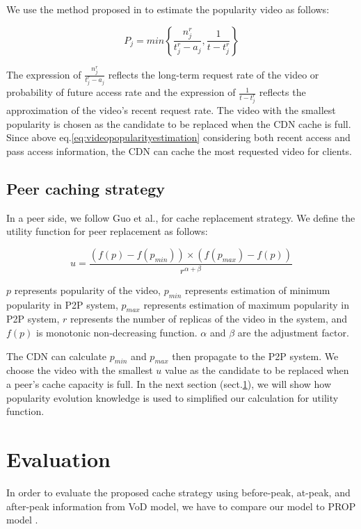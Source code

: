 \documentclass[conference]{IEEEtran}
\begin{document}
We use the method proposed in \cite{1613869} to estimate the popularity video as follows:

\begin{equation}
P_j = min\left\{\frac{n_j^r}{t_j^r - a_j}, \frac{1}{t - t_j^r}\right\}
\label{eq:videopopularityestimation}
\end{equation}

The expression of $\frac{n_j^r}{t_j^r - a_j}$ reflects the long-term request rate of the video or probability of future access rate and the expression of $\frac{1}{t - t_j^r}$ reflects the approximation of the video's recent request rate.
The video with the smallest popularity is chosen as the candidate to be replaced when the CDN cache is full. 
Since above eq.\ref{eq:videopopularityestimation} considering both recent access and pass access information, the CDN can cache the most requested video for clients.

\subsection{Peer caching strategy}\label{peercachingstrategy}
In a peer side, we follow Guo et al., \cite{1613869} for cache replacement strategy. 
We define the utility function for peer replacement as follows:

\begin{equation}
u = \frac{ (f(p)-f(p_{min})) \times  (f(p_{max})-f(p))}{r^{\alpha + \beta}}
\label{eq:utilityfunction}
\end{equation}

$p$ represents popularity of the video, $p_{min}$ represents estimation of minimum popularity in P2P system, $p_{max}$ represents estimation of maximum popularity in P2P system, $r$ represents the number of replicas of the video in the system, and $f(p)$ is monotonic non-decreasing function.
$\alpha$ and $\beta$ are the adjustment factor.

The CDN can calculate $p_{min}$ and $p_{max}$ then propagate to the P2P system.
We choose the video with the smallest $u$ value as the candidate to be replaced when a peer's cache capacity is full.
In the next section (sect.\ref{evaluation}), we will show how popularity evolution knowledge is used to simplified our calculation for utility function.




\section{Evaluation}\label{evaluation}
In order to evaluate the proposed cache strategy using before-peak, at-peak, and after-peak information from VoD model, we have to compare our model to PROP model \cite{1613869}.
\end{document}
